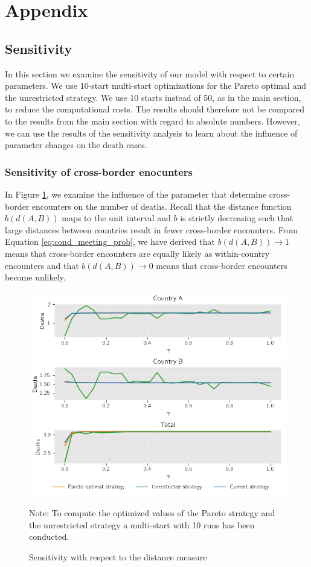 \appendix
{}
\section{Appendix}
\subsection{Sensitivity}
\label{A:sensitivity}
In this section we examine the sensitivity of our model with respect to certain parameters. We use 10-start multi-start optimizations for the Pareto optimal and the unrestricted strategy. We use 10 starts instead of 50, as in the main section, to reduce the computational costs. The results should therefore not be compared to the results from the main section with regard to absolute numbers. However, we can use the results of the sensitivity analysis to learn about the influence of parameter changes on the death cases.

\subsubsection{Sensitivity of cross-border enocunters}
\label{A:encounters}
In Figure \ref{fig:sensitivity}, we examine the influence of the parameter that determine cross-border encounters on the number of deaths. Recall that the distance function $b(d(A,B))$ maps to the unit interval and $b$ is strictly decreasing such that large distances between countries result in fewer cross-border encounters. From Equation \eqref{eq:cond_meeting_prob}, we have derived that $b(d(A,B)) \to 1$ means that cross-border encounters are equally likely as within-country encounters and that $b(d(A,B)) \to 0$ means that cross-border encounters become unlikely.
\begin{figure}[h!]
\centering
\includegraphics[scale=0.59]{images/sensitivity.png}
\begin{flushleft}
\scriptsize{Note:} To compute the optimized values of the Pareto strategy and the unrestricted strategy a multi-start with 10 runs has been conducted.
\end{flushleft}
\caption{Sensitivity with respect to the distance measure}
\label{fig:sensitivity}
\end{figure}

